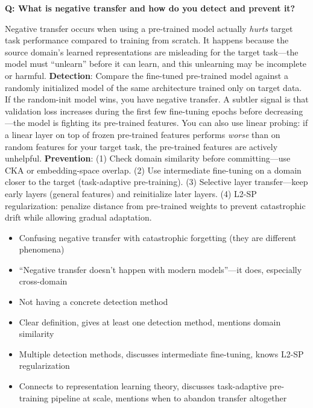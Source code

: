 \begin{interviewq}
\textbf{Q: What is negative transfer and how do you detect and prevent it?}

 \quad {} \quad \badgefreq{\freqmed}

\stronganswer Negative transfer occurs when using a pre-trained model actually \textit{hurts} target task performance compared to training from scratch. It happens because the source domain's learned representations are misleading for the target task---the model must ``unlearn'' before it can learn, and this unlearning may be incomplete or harmful. \textbf{Detection}: Compare the fine-tuned pre-trained model against a randomly initialized model of the same architecture trained only on target data. If the random-init model wins, you have negative transfer. A subtler signal is that validation loss increases during the first few fine-tuning epochs before decreasing---the model is fighting its pre-trained features. You can also use linear probing: if a linear layer on top of frozen pre-trained features performs \textit{worse} than on random features for your target task, the pre-trained features are actively unhelpful. \textbf{Prevention}: (1) Check domain similarity before committing---use CKA or embedding-space overlap. (2) Use intermediate fine-tuning on a domain closer to the target (task-adaptive pre-training). (3) Selective layer transfer---keep early layers (general features) and reinitialize later layers. (4) L2-SP regularization: penalize distance from pre-trained weights to prevent catastrophic drift while allowing gradual adaptation.

\redflags
\begin{itemize}
    \item Confusing negative transfer with catastrophic forgetting (they are different phenomena)
    \item ``Negative transfer doesn't happen with modern models''---it does, especially cross-domain
    \item Not having a concrete detection method
\end{itemize}


\goodgreat
\begin{itemize}
    \item {} Clear definition, gives at least one detection method, mentions domain similarity
    \item {} Multiple detection methods, discusses intermediate fine-tuning, knows L2-SP regularization
    \item {} Connects to representation learning theory, discusses task-adaptive pre-training pipeline at scale, mentions when to abandon transfer altogether
\end{itemize}

\end{interviewq}

